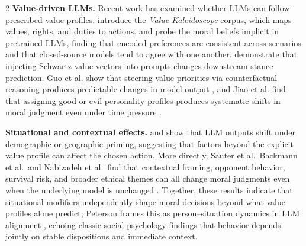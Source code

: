 \documentclass[11pt]{article}
\begin{document}
\begin{multicols}{2}
\textbf{Value-driven LLMs.}
Recent work has examined whether LLMs can follow prescribed value profiles. \citet{sorensen2024value} introduce the \emph{Value Kaleidoscope} corpus, which maps values, rights, and duties to actions. \citet{abdulhai2023moral} and \citet{scherrer2023evaluating} probe the moral beliefs implicit in pretrained LLMs, finding that encoded preferences are consistent across scenarios and that closed-source models tend to agree with one another. \citet{kang2023values} demonstrate that injecting Schwartz value vectors into prompts changes downstream stance prediction. Guo et al. show that steering value priorities via counterfactual reasoning produces predictable changes in model output \citep{guo2026counterfactual}, and Jiao et al. find that assigning good or evil personality profiles produces systematic shifts in moral judgment even under time pressure \citep{jiao2025ai}. 

\textbf{Situational and contextual effects.}
\citet{santurkar2023whose} and \citet{durmus2023globalopinionqa} show that LLM outputs shift under demographic or geographic priming, suggesting that factors beyond the explicit value profile can affect the chosen action. More directly, Sauter et al.\, Backmann et al.\, and Nabizadeh et al.\ find that contextual framing, opponent behavior, survival risk, and broader ethical themes can all change moral judgments even when the underlying model is unchanged \citep{sauter2026between, backmann2025ethics, nabizadeh2026large}. Together, these results indicate that situational modifiers independently shape moral decisions beyond what value profiles alone predict; Peterson frames this as person--situation dynamics in LLM alignment \citep{peterson2025context}, echoing classic social-psychology findings that behavior depends jointly on stable dispositions and immediate context.


\end{multicols}
\end{document}
